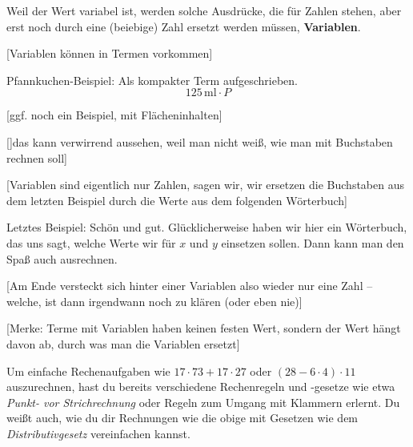 \documentclass[../../main.tex]{subfiles}
\begin{document}
Weil der Wert variabel ist, werden solche Ausdrücke, die für Zahlen stehen, aber erst noch durch eine (beiebige) Zahl ersetzt werden müssen, \textbf{Variablen}.

[Variablen können in Termen vorkommen]

\begin{example}
    Pfannkuchen-Beispiel: Als kompakter Term aufgeschrieben.
    \[125\,\text{ml}\cdot P\]
\end{example}

[ggf. noch ein Beispiel, mit Flächeninhalten]

[]das kann verwirrend aussehen, weil man nicht weiß, wie man mit Buchstaben rechnen soll]

[Variablen sind eigentlich nur Zahlen, sagen wir, wir ersetzen die Buchstaben aus dem letzten Beispiel durch die Werte aus dem folgenden Wörterbuch]

\begin{example}
    
    Letztes Beispiel: Schön und gut. Glücklicherweise haben wir hier ein Wörterbuch, das uns sagt, welche Werte wir für $x$ und $y$ einsetzen sollen. Dann kann man den Spaß auch ausrechnen.
\end{example}

[Am Ende versteckt sich hinter einer Variablen also wieder nur eine Zahl -- welche, ist dann irgendwann noch zu klären (oder eben nie)]

[Merke: Terme mit Variablen haben keinen festen Wert, sondern der Wert hängt davon ab, durch was man die Variablen ersetzt]

Um einfache Rechenaufgaben wie $17\cdot73+17\cdot 27$ oder $(28-6\cdot 4)\cdot 11$ auszurechnen, hast du bereits verschiedene Rechenregeln und -gesetze wie etwa \emph{Punkt- vor Strichrechnung} oder Regeln zum Umgang mit Klammern erlernt. Du weißt auch, wie du dir Rechnungen wie die obige mit Gesetzen wie dem \emph{Distributivgesetz} vereinfachen kannst.
\end{document}

